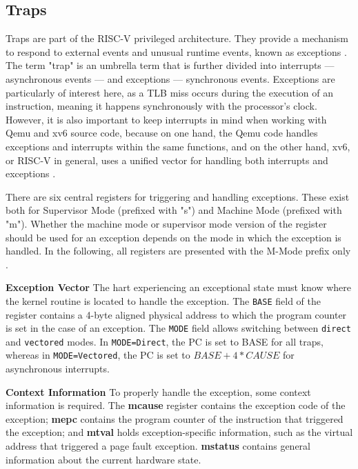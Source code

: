 \subsection{Traps}
Traps are part of the RISC-V privileged architecture. They provide a mechanism to respond to
external events and unusual runtime events, known as exceptions \cite{riscvreader}.
The term "trap" is an umbrella term that is further divided into interrupts — asynchronous events —
and exceptions — synchronous events.
Exceptions are particularly of interest here, as a TLB miss occurs during the execution of an instruction,
meaning it happens synchronously with the processor's clock. However, it is also important to keep interrupts
in mind when working with Qemu and xv6 source code, because on one hand, the Qemu code handles exceptions
and interrupts within the same functions, and on the other hand, xv6, or RISC-V in general, uses a unified
vector for handling both interrupts and exceptions \cite{RISCVInstructionSet}.

There are six central registers for triggering and handling exceptions. These exist both for
Supervisor Mode (prefixed with "s") and Machine Mode (prefixed with "m").
Whether the machine mode or supervisor mode version of the register should be used for an exception depends
on the mode in which the exception is handled. In the following, all registers are presented with the
M-Mode prefix only .


\textbf{Exception Vector} The hart  experiencing
an exceptional state must know where the kernel routine is located to handle the exception.
The \texttt{BASE} field of the register contains a 4-byte aligned physical address to which
the program counter is set in the case of an exception.
The \texttt{MODE} field allows switching between \texttt{direct} and \texttt{vectored} modes.
In \texttt{MODE=Direct}, the PC is set to BASE for all traps, whereas in \texttt{MODE=Vectored},
the PC is set to $BASE+4*CAUSE$ for asynchronous interrupts.


\textbf{Context Information} To properly handle the exception, some context information is required.
The \textbf{mcause} register contains the exception code of the exception; \textbf{mepc} contains
the program counter of the instruction that triggered the exception; and \textbf{mtval} holds
exception-specific information, such as the virtual address that triggered a page fault exception.
\textbf{mstatus} contains general information about the current hardware state.

